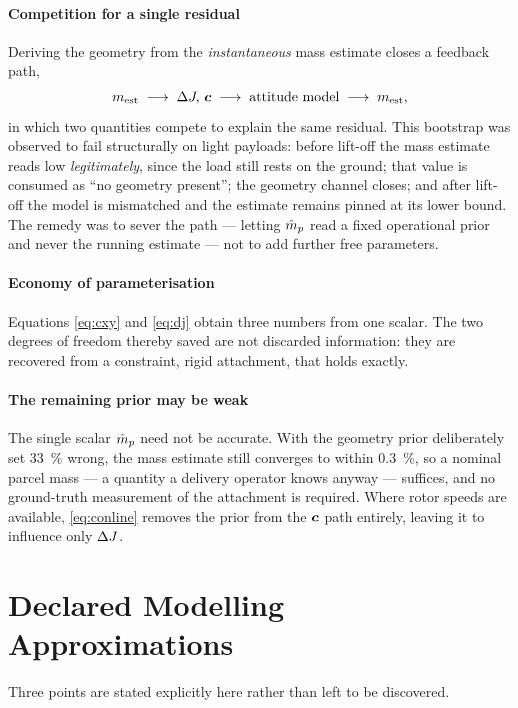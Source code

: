 \paragraph{Competition for a single residual} Deriving the geometry from
the \emph{instantaneous} mass estimate closes a feedback path,
\begin{equation*}
m_{\mathrm{est}} \;\longrightarrow\; \Delta J,\, \bm{c}
\;\longrightarrow\; \text{attitude model}
\;\longrightarrow\; m_{\mathrm{est}},
\end{equation*}
in which two quantities compete to explain the same residual. This
bootstrap was observed to fail structurally on light payloads: before
lift-off the mass estimate reads low \emph{legitimately}, since the load
still rests on the ground; that value is consumed as ``no geometry
present''; the geometry channel closes; and after lift-off the model is
mismatched and the estimate remains pinned at its lower bound. The remedy
was to sever the path --- letting $\hat{m}_p$ read a fixed operational prior
and never the running estimate --- not to add further free parameters.

\paragraph{Economy of parameterisation} Equations \eqref{eq:cxy} and
\eqref{eq:dj} obtain three numbers from one scalar. The two degrees of
freedom thereby saved are not discarded information: they are recovered
from a constraint, rigid attachment, that holds exactly.

\paragraph{The remaining prior may be weak} The single scalar $\hat{m}_p$
need not be accurate. With the geometry prior deliberately set
\SI{33}{\percent} wrong, the mass estimate still converges to within
\SI{0.3}{\percent}, so a nominal parcel mass --- a quantity a delivery
operator knows anyway --- suffices, and no ground-truth measurement of
the attachment is required. Where rotor speeds are available,
\eqref{eq:conline} removes the prior from the $\bm{c}$ path entirely,
leaving it to influence only $\Delta J$.

\section{Declared Modelling Approximations}\label{sec:model:approx}

Three points are stated explicitly here rather than left to be
discovered.

